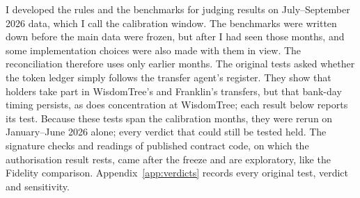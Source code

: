\documentclass[12pt,a4paper]{article}
\begin{document}
I developed the rules and the benchmarks for judging results on July--September 2026 data, which I call the calibration window. The benchmarks were written down before the main data were frozen, but after I had seen those months, and some implementation choices were also made with them in view. The reconciliation therefore uses only earlier months. The original tests asked whether the token ledger simply follows the transfer agent's register. They show that holders take part in WisdomTree's and Franklin's transfers, but that bank-day timing persists, as does concentration at WisdomTree; each result below reports its test. Because these tests span the calibration months, they were rerun on January--June 2026 alone; every verdict that could still be tested held. The signature checks and readings of published contract code, on which the authorisation result rests, came after the freeze and are exploratory, like the Fidelity comparison. Appendix~\ref{app:verdicts} records every original test, verdict and sensitivity.
\end{document}
